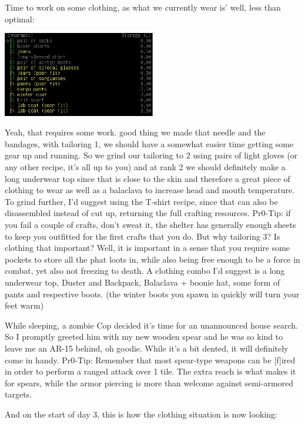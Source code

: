 \documentclass[11pt]{report}
\begin{document}
Time to work on some clothing, as what we currently wear is' well, less than optimal:

\begin{center}
\includegraphics[width=0.5\textwidth]{11}
\end{center}

Yeah, that requires some work. good thing we made that needle and the bandages, with tailoring 1, we should have a somewhat easier time getting some gear up and running. So we grind our tailoring to 2 using pairs of light gloves (or any other recipe, it's all up to you) and at rank 2 we should definitely  make a long underwear top since that is close to the skin and therefore a great piece of clothing to wear as well as a balaclava to increase head and mouth temperature.
To grind further, I'd suggest using the T-shirt recipe, since that can also be disassembled instead of cut up, returning the full crafting resources.
Pr0-Tip: if you fail a couple of crafts, don't sweat it, the shelter has generally enough sheets to keep you outfitted for the first crafts that you do.
But why tailoring 3? Is clothing that important? Well, it is important in a sense that you require some pockets to store all the phat loots in, while also being free enough to be a force in combat, yet also not freezing to death. A clothing combo I'd suggest is a long underwear top, Duster and Backpack, Balaclava + boonie hat, some form of pants and respective boots. (the winter boots you spawn in quickly will turn your feet warm)

While sleeping, a zombie Cop decided it's time for an unannounced house search. So I promptly greeted him with my new wooden spear and he was so kind to leave me an AR-15 behind, oh goodie. While it's a bit dented, it will definitely come in handy.
Pr0-Tip: Remember that most spear-type weapons can be [f]ired in order to perform a ranged attack over 1 tile. The extra reach is what makes it for spears, while the armor piercing is more than welcome against semi-armored targets.

And on the start of day 3, this is how the clothing situation is now looking:
\end{document}
